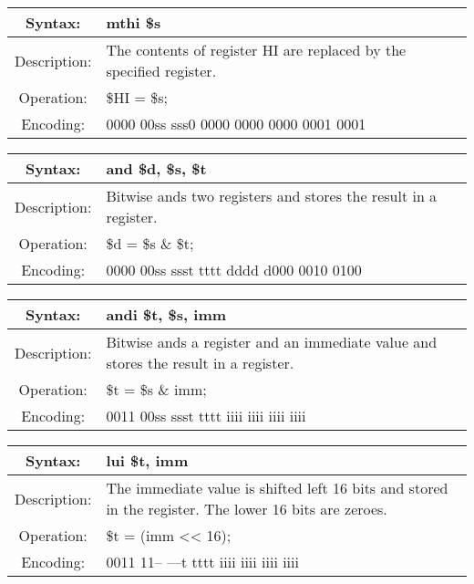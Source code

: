     \begin{table}[!hbp]
    \begin{tabularx}{\textwidth}{|c|X|}
        \hline
        Syntax: & mthi \$s \\
        \hline
        Description: & The contents of register HI are replaced by the specified register. \\
        \hline
        Operation: & \$HI = \$s; \\
        \hline
        Encoding: & 0000 00ss sss0 0000 0000 0000 0001 0001 \\
        \hline
    \end{tabularx}
    \end{table}

    \begin{table}[!hbp]
    \begin{tabularx}{\textwidth}{|c|X|}
        \hline
        Syntax: & and \$d, \$s, \$t \\
        \hline
        Description: & Bitwise ands two registers and stores the result in a register. \\
        \hline
        Operation: & \$d = \$s \& \$t; \\
        \hline
        Encoding: & 0000 00ss ssst tttt dddd d000 0010 0100 \\
        \hline
    \end{tabularx}
    \end{table}

    \begin{table}[!hbp]
    \begin{tabularx}{\textwidth}{|c|X|}
        \hline
        Syntax: & andi \$t, \$s, imm \\
        \hline
        Description: & Bitwise ands a register and an immediate value and stores the result in a register. \\
        \hline
        Operation: & \$t = \$s \& imm; \\
        \hline
        Encoding: & 0011 00ss ssst tttt iiii iiii iiii iiii \\
        \hline
    \end{tabularx}
    \end{table}

    \begin{table}[!hbp]
    \begin{tabularx}{\textwidth}{|c|X|}
        \hline
        Syntax: & lui \$t, imm \\
        \hline
        Description: & The immediate value is shifted left 16 bits and stored in the register.
                         The lower 16 bits are zeroes. \\
        \hline
        Operation: & \$t = (imm << 16); \\
        \hline
        Encoding: & 0011 11-- ---t tttt iiii iiii iiii iiii \\
        \hline
    \end{tabularx}
    \end{table}

